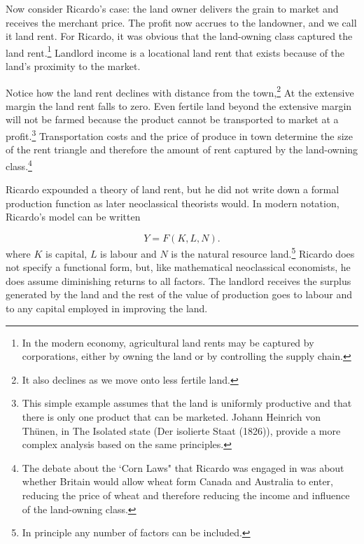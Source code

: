 Now consider Ricardo's case: the land owner delivers the grain to market and receives the merchant price. The profit now accrues to the landowner, and we call it land rent. For Ricardo, it was obvious that the land-owning class captured the land rent.\footnote{In the modern economy, agricultural land rents may be captured by corporations,  either by owning the land or by controlling the supply chain.}  Landlord income is a locational land rent that exists  because of the land's proximity to the market. 

Notice how the land rent declines with distance from the town,\footnote{It also declines as we move onto less fertile land.} At the extensive margin the land rent falls to zero. Even fertile land beyond the extensive margin will not be farmed because the product cannot be transported to market at a profit.\footnote{This simple example assumes that the land is uniformly productive and that there is only one product that can be marketed. Johann Heinrich von Th\"unen, in The Isolated state (Der isolierte Staat (1826)), provide a more complex analysis based on the same principles.} Transportation costs and the price of produce in town determine the size of the  rent triangle and therefore the amount of rent captured by the land-owning class.\footnote{The debate about the  `Corn Laws" that Ricardo  was engaged in was about whether Britain would allow wheat form Canada and Australia to enter, reducing the price of wheat and therefore reducing the income and influence of the land-owning class.} 


Ricardo expounded a theory of land rent, but he did not write down a formal production function as later neoclassical theorists would. In modern notation, Ricardo's model can be written


\begin{equation} 
Y=F(K,L,N).
\label{Eqn:Prod1}
\end{equation} 
where $K$ is capital, $L$ is labour and $N$  is the natural resource  land.\footnote{In principle any number of factors can be included.} 
Ricardo does not specify a functional form, but, like mathematical neoclassical economists, he does assume diminishing returns to all factors. The landlord  receives the surplus generated by the land and the rest of the value of production goes to labour and to any capital employed in improving the land. 

